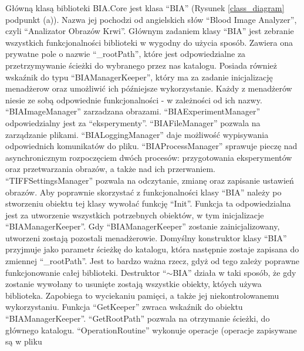 \documentclass{article}
\begin{document}
        \vspace{0.5cm}

        {
            \Large
            \justifying
            \quad
            Główną klasą biblioteki BIA.Core jest klasa ``BIA'' (Rysunek \ref{class_diagram} podpunkt (a)).
            Nazwa jej pochodzi od angielskich słów ``Blood Image Analyzer'', czyli ``Analizator Obrazów Krwi''.
            Głównym zadaniem klasy ``BIA'' jest zebranie wszystkich funkcjonalności biblioteki w wygodny do użycia sposób.
            Zawiera ona prywatne pole o nazwie ``\_rootPath'', które jest odpowiedzialne za przetrzymywanie ścieżki do wybranego przez nas katalogu.
            Posiada również wskaźnik do typu ``BIAManagerKeeper'', który ma za zadanie inicjalizację menadżerow oraz umożliwić ich późniejsze wykorzystanie.
            Każdy z menadżerów niesie ze sobą odpowiednie funkcjonalności - w zależności od ich nazwy.
            ``BIAImageManager'' zarzadzana obrazami.
            ``BIAExperimentManager'' odpowiedzialny jest za ``eksperymenty''.
            ``BIAFileManager'' pozwala na zarządzanie plikami.
            ``BIALoggingManager'' daje możliwość wypisywania odpowiednich komunikatów do pliku.
            ``BIAProcessManager'' sprawuje pieczę nad asynchronicznym rozpoczęciem dwóch procesów: przygotowania eksperymentów oraz przetwarzania obrazów,
            a także nad ich przerwaniem.
            ``TIFFSettingsManager'' pozwala na odczytanie, zmianę oraz zapisanie ustawień obrazów.
            Aby poprawnie skorzystać z funkcjonalności klasy ``BIA'' należy po stworzeniu obiektu tej klasy wywołać funkcję ``Init''.
            Funkcja ta odpowiedzialna jest za utworzenie wszystkich potrzebnych obiektów, w tym inicjalizacje ``BIAManagerKeeper''.
            Gdy ``BIAManagerKeeper'' zostanie zainicjalizowany, utworzeni zostają pozostali menadżerowie.
            Domyślny konstruktor klasy ``BIA'' przyjmuje jako parametr ścieżkę do katalogu, która następnie zostaje zapisana do zmiennej ``\_rootPath''.
            Jest to bardzo ważna rzecz, gdyż od tego zależy poprawne funkcjonowanie całej biblioteki.
            Destruktor ``$\sim$BIA'' działa w taki sposób, że gdy zostanie wywołany to usunięte zostają wszystkie obiekty, któych używa biblioteka.
            Zapobiega to wyciekaniu pamięci, a także jej niekontrolowanemu wykorzystaniu.
            Funkcja ``GetKeeper'' zwraca wskaźnik do obiektu ``BIAManagerKeeper''.
            ``GetRootPath'' pozwala na otrzymanie ścieżki, do głównego katalogu.
            ``OperationRoutine'' wykonuje operacje (operacje zapisywane są w pliku 
}
\end{document}
